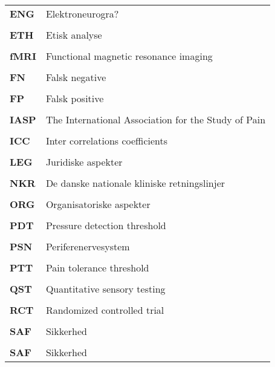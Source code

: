 \begin{longtable}{p{}  p{}}
\textbf{ENG} & Elektroneurogra?                                         
\\ \\
\textbf{ETH} & Etisk analyse                                            
\\ \\
\textbf{fMRI}& Functional magnetic resonance imaging                    
\\ \\
\textbf{FN}  & Falsk negative                                           
\\ \\
\textbf{FP}  & Falsk positive                                           
\\ \\
\textbf{IASP}& The International Association for the Study of Pain      
\\ \\
\textbf{ICC} & Inter correlations coefficients                          
\\ \\
\textbf{LEG} & Juridiske aspekter                                       
\\ \\
\textbf{NKR} & De danske nationale kliniske retningslinjer              
\\ \\
\textbf{ORG} & Organisatoriske aspekter                                 
\\ \\
\textbf{PDT} & Pressure detection threshold                             
\\ \\
\textbf{PSN} & Periferenervesystem                                      
\\ \\
\textbf{PTT} & Pain tolerance threshold                                 
\\ \\
\textbf{QST} & Quantitative sensory testing                             
\\ \\
\textbf{RCT} & Randomized controlled trial                              
\\ \\
\textbf{SAF} & Sikkerhed                                                
\\ \\
\textbf{SAF} & Sikkerhed                                                

\end{longtable}
